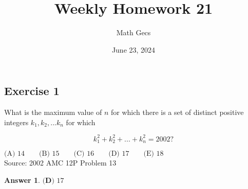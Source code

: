 \documentclass[12pt]{article}
\title{Weekly Homework 21}
\author{Math Gecs}
\date{June 23, 2024}
\newtheorem*{answer*}{Answer}
\begin{document}
\maketitle

\subsection*{Exercise 1}
What is the maximum value of $n$ for which there is a set of distinct positive integers $k_1, k_2, ... k_n$ for which

\[k^2_1 + k^2_2 + ... + k^2_n = 2002?\]

$\text{(A) }14 \qquad \text{(B) }15 \qquad \text{(C) }16 \qquad \text{(D) }17 \qquad \text{(E) }18$ \\

Source: 2002 AMC 12P Problem 13\\

\begin{answer*}
$\boxed {\textbf{(D) }17}$
\end{answer*}
\end{document}

